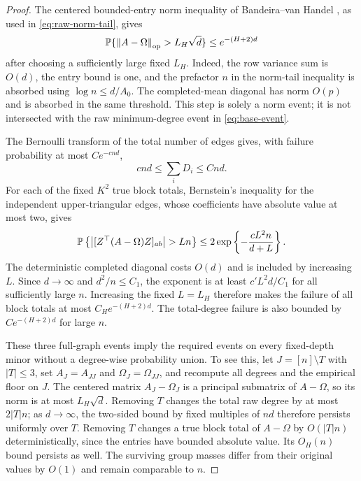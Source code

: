 \begin{proof}
The centered bounded-entry norm inequality of Bandeira--van Handel
\cite[Corollary 3.12 and Remark 3.13]{bvh}, as used in
\eqref{eq:raw-norm-tail}, gives
\[
 \mathbb P\{\left\lVert A-\Omega\right\rVert_{\mathrm{op}}>L_H\sqrt d\}
 \le e^{-(H+2)d}
\]
after choosing a sufficiently large fixed $L_H$. Indeed, the row
variance sum is $O(d)$, the entry bound is one, and the prefactor $n$
in the norm-tail inequality is absorbed using $\log n\le d/A_0$.
The completed-mean diagonal has norm $O(p)$ and is absorbed in the
same threshold. This step is solely a norm event; it is not intersected
with the raw minimum-degree event in \eqref{eq:base-event}.

The Bernoulli transform of the total number of edges gives, with
failure probability at most $Ce^{-cnd}$,
\[
 cnd\le\sum_iD_i\le Cnd.
\]
For each of the fixed $K^2$ true block totals, Bernstein's inequality
for the independent upper-triangular edges, whose coefficients have
absolute value at most two, gives
\[
 \PP\left\{\left|[Z^\top(A-\Omega)Z]_{ab}\right|>Ln\right\}
 \le 2\exp\left\{-\frac{cL^2n}{d+L}\right\}.
\]
The deterministic completed diagonal costs $O(d)$ and is included
by increasing $L$. Since $d\to\infty$ and $d^2/n\le C_1$,
the exponent is at least $c'L^2d/C_1$ for all sufficiently large $n$.
Increasing the fixed $L=L_H$ therefore makes the failure of all block
totals at most $C_He^{-(H+2)d}$. The total-degree failure is also
bounded by $Ce^{-(H+2)d}$ for large $n$.

These three full-graph events imply the required events on every
fixed-depth minor without a degree-wise probability union. To see this,
let $J=[n]\setminus T$ with $|T|\le3$, set $A_J=A_{JJ}$ and
$\Omega_J=\Omega_{JJ}$, and recompute all degrees and the empirical
floor on $J$. The centered matrix $A_J-\Omega_J$ is a principal
submatrix of $A-\Omega$, so its norm is at most $L_H\sqrt d$.
Removing $T$ changes the total raw degree by at most $2|T|n$;
as $d\to\infty$, the two-sided bound by fixed multiples of $nd$
therefore persists uniformly over $T$. Removing $T$ changes a true
block total of $A-\Omega$ by $O(|T|n)$ deterministically, since
the entries have bounded absolute value. Its $O_H(n)$ bound persists
as well. The surviving group masses differ from their original
values by $O(1)$ and remain comparable to $n$.


\end{proof}
